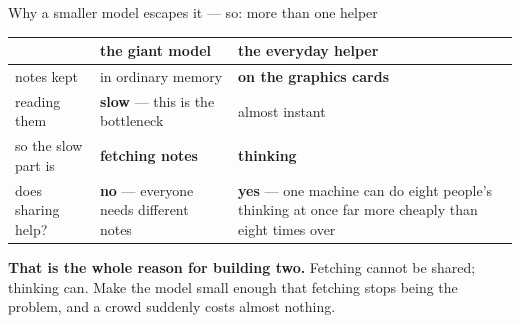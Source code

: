 \documentclass[aspectratio=169]{beamer}
\newcommand{\keybox}[1]{%
  \begin{center}
  \colorbox{black!8}{\parbox{0.92\textwidth}{\centering #1}}
  \end{center}}
\begin{document}
\begin{frame}{Why a smaller model escapes it --- so: more than one helper}

\begin{center}
\scriptsize
\renewcommand{\arraystretch}{1.3}
\begin{tabular}{@{}p{}p{}p{}@{}}
\toprule
& \textbf{the giant model} & \textbf{the everyday helper} \\
\midrule
notes kept & in ordinary memory & \textbf{on the graphics cards} \\
reading them & \textbf{slow} --- this is the bottleneck & almost instant \\
so the slow part is & \textbf{fetching notes} & \textbf{thinking} \\
does sharing help? & \textbf{no} --- everyone needs different notes & \textbf{yes} --- one machine can do eight people's thinking at once far more cheaply than eight times over \\
\bottomrule
\end{tabular}
\end{center}

\vspace{0.4em}
\keybox{\small \textbf{That is the whole reason for building two.} Fetching cannot be shared;
thinking can. Make the model small enough that fetching stops being the problem, and a crowd
suddenly costs almost nothing.}

\vspace{0.4em}
\begin{center}
\end{center}

\end{frame}
\end{document}
